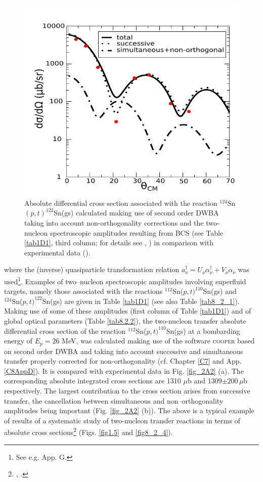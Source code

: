 \begin{figure}\label{fig2A3}
\centerline{\includegraphics*[width=\textwidth,angle=0]{nutshell/figs/fig2A3_v2}}
\caption{Absolute differential cross section associated with the reaction $^{124}$Sn$(p,t)^{122}$Sn(gs) calculated making use of second order DWBA taking into account non-orthogonality corrections and the two-nucleon spectroscopic amplitudes resulting from BCS (see Table \ref{tab1D1}, third column; for details see \cite{Potel:13}, \cite{Potel:13b}) in comparison with experimental data (\cite{Guazzoni:11}).}\label{fig_2A3}
\end{figure}
where the (inverse) quasiparticle transformation relation $a^{\dagger}_\nu=U_{\nu}\alpha^{\dagger}_{\nu}+V_{\nu}\alpha_{\bar{\nu}}$ was used\footnote{See e.g. \cite{Brink:05} App. G.}. Examples of  two--nucleon spectroscopic amplitudes involving superfluid targets, namely those associated with the reactions $^{112}$Sn($p,t)^{110}$Sn(gs) and\\ $^{124}$Sn($p,t)^{122}$Sn(gs) are given in Table \ref{tab1D1} (see also Table \ref{tab8_2_1}). Making use of some of these amplitudes (first column of Table \ref{tab1D1}) and of global optical parameters (Table \ref{tab8.2.2}), the two-nucleon transfer absolute differential cross section of the reaction $^{112}$Sn($p,t)^{110}$Sn(gs) at a bombarding energy of $E_p=26$ MeV, was calculated making use of the software \textsc{cooper} based on second order DWBA and taking into account successive and simultaneous transfer properly corrected for non-orthogonality (cf. Chapter \ref{C7} and App. \ref{C8AppD}). It is compared with experimental data in Fig. \ref{fig_2A2} (a). The corresponding absolute integrated cross sections are 1310 $\mu$b and 1309$\pm 200 \,\mu$b respectively. The largest contribution to the cross section arises from successive transfer, the cancellation between simultaneous and non--orthogonality amplitudes being important (Fig. \ref{fig_2A2} (b)). The above is a typical example of results of a systematic study of two-nucleon transfer reactions in terms of absolute cross sections\footnote{\cite{Potel:13}, \cite{Potel:13b}.} (Figs. \ref{fig1.5} and  \ref{fig8_2_4}).



